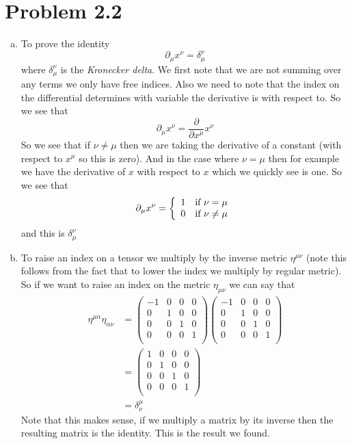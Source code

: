 \documentclass[11pt]{article}
\numberwithin{equation}{section}
\begin{document}
\section{Problem 2.2}
\begin{enumerate}[(a)]
\item
To prove the identity 
$$\partial_{\mu}x^{\nu} = \delta^{\nu}_{\mu}$$
where $\delta^{\nu}_{\mu}$ is the \emph{Kronecker delta}. We first note that we are not summing over any terms we only have free indices. Also we need to note that the index on the differential determines with variable the derivative is with respect to. So we see that
$$\partial_{\mu}x^{\nu} = \frac{\partial}{\partial x^{\mu}}x^{\nu}$$
So we see that if $\nu\ne\mu$ then we are taking the derivative of a constant (with respect to $x^{\mu}$ so this is zero).  And in the case where $\nu=\mu$ then for example we have the derivative of $x$ with respect to $x$ which we quickly see is one. So we see that
$$\partial_{\mu}x^{\nu} = \left\{\begin{array}{lc}
				1	&\textnormal{if}\ \nu=\mu\\
				0	&\textnormal{if}\ \nu\ne\mu
			\end{array}\right.$$
and this is $\delta^{\nu}_{\mu}$

\item
To raise an index on a tensor we multiply by the inverse metric $\eta^{\mu\nu}$ (note this follows from the fact that to lower the index we multiply by regular metric). So if we want to raise an index on the metric $\eta_{\mu\nu}$ we can say that
\begin{align*}
\eta^{\mu\alpha}\eta_{\alpha\nu} &= \left(\begin{array}{cccc}
	-1 &0 &0 &0\\
	0 &1 &0 &0\\
	0 &0 &1 &0\\
	0 &0 &0 &1\\
	\end{array}\right)
	\left(\begin{array}{cccc}
	-1 &0 &0 &0\\
	0 &1 &0 &0\\
	0 &0 &1 &0\\
	0 &0 &0 &1\\
	\end{array}\right)\\
&=	\left(\begin{array}{cccc}
	1 &0 &0 &0\\
	0 &1 &0 &0\\
	0 &0 &1 &0\\
	0 &0 &0 &1\\
	\end{array}\right)\\
&= \delta^{\mu}_{\nu}
\end{align*}
Note that this makes sense, if we multiply a matrix by its inverse then the resulting matrix is the identity. This is the result we found. 


\end{enumerate}
\end{document}
